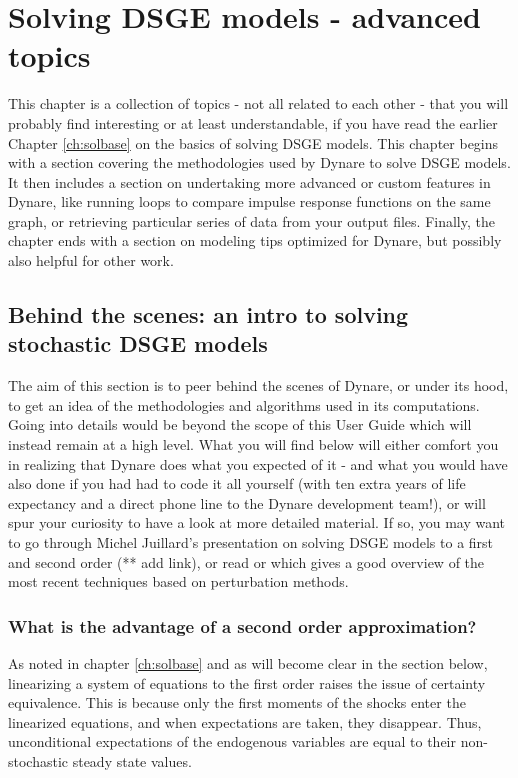 \chapter{Solving DSGE models - advanced topics} \label{ch:soladv}

This chapter is a collection of topics - not all related to each other - that you will probably find interesting or at least understandable, if you have read the earlier Chapter \ref{ch:solbase} on the basics of solving DSGE models. This chapter begins with a section covering the methodologies used by Dynare to solve DSGE models. It then includes a section on undertaking more advanced or custom features in Dynare, like running loops to compare impulse response functions on the same graph, or retrieving particular series of data from your output files. Finally, the chapter ends with a section on modeling tips optimized for Dynare, but possibly also helpful for other work.\\

\section{Behind the scenes: an intro to solving stochastic DSGE models}
The aim of this section is to peer behind the scenes of Dynare, or under its hood, to get an idea of the methodologies and algorithms used in its computations. Going into details would be beyond the scope of this User Guide which will instead remain at a high level. What you will find below will either comfort you in realizing that Dynare does what you expected of it - and what you would have also done if you had had to code it all yourself (with ten extra years of life expectancy and a direct phone line to the Dynare development team!), or will spur your curiosity to have a look at more detailed material. If so, you may want to go through Michel Juillard's presentation on solving DSGE models to a first and second order (** add link), or read \citet{CollardJuillard2001b} or \citet{SchmittGrohe2004} which gives a good overview of the most recent techniques based on perturbation methods. \\

\subsection{What is the advantage of a second order approximation?}
As noted in chapter \ref{ch:solbase} and as will become clear in the section below, linearizing a system of equations to the first order raises the issue of certainty equivalence. This is because only the first moments of the shocks enter the linearized equations, and when expectations are taken, they disappear. Thus, unconditional expectations of the endogenous variables are equal to their non-stochastic steady state values. \\

